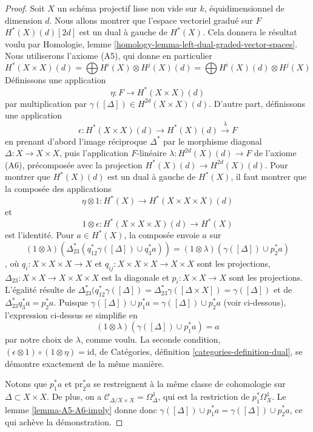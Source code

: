 \begin{proof}
Soit $X$ un schéma projectif lisse non vide sur $k$,
équidimensionnel de dimension $d$. Nous allons montrer que l'espace vectoriel gradué sur $F$
$H^*(X)(d)[2d]$ est un dual à gauche de $H^*(X)$. Cela donnera le résultat voulu par
Homologie, lemme \ref{homology-lemma-left-dual-graded-vector-spaces}.
Nous utiliserons l'axiome (A5), qui donne en particulier
$$
H^*(X \times X)(d) =
\bigoplus H^i(X) \otimes H^j(X)(d) =
\bigoplus H^i(X)(d) \otimes H^j(X)
$$
Définissons une application
$$
\eta : F \longrightarrow H^*(X \times X)(d)
$$
par multiplication par $\gamma([\Delta]) \in H^{2d}(X \times X)(d)$.
D'autre part, définissons une application
$$
\epsilon :
H^*(X \times X)(d) \longrightarrow H^*(X)(d) \xrightarrow{\lambda} F
$$
en prenant d'abord l'image réciproque $\Delta^*$ par le morphisme diagonal
$\Delta : X \to X \times X$, puis l'application $F$-linéaire
$\lambda : H^{2d}(X)(d) \to F$ de l'axiome (A6), précomposée
avec la projection $H^*(X)(d) \to H^{2d}(X)(d)$.
Pour montrer que $H^*(X)(d)$ est un dual à gauche de $H^*(X)$,
il faut montrer que la composée des applications
$$
\eta \otimes 1 :
H^*(X) \longrightarrow H^*(X \times X \times X)(d)
$$
et
$$
1 \otimes \epsilon : H^*(X \times X \times X)(d) \longrightarrow H^*(X)
$$
est l'identité. Pour $a \in H^*(X)$,
la composée envoie $a$ sur
$$
(1 \otimes \lambda)(\Delta_{23}^*(q_{12}^*\gamma([\Delta]) \cup q_3^*a)) =
(1 \otimes \lambda)(\gamma([\Delta]) \cup p_2^*a)
$$,
où $q_i : X \times X \times X \to X$ et
$q_{ij} : X \times X \times X \to X \times X$ sont les projections,
$\Delta_{23} : X \times X \to X \times X \times X$ est la diagonale et
$p_i : X \times X \to X$ sont les projections.
L'égalité résulte de $\Delta_{23}^*(q_{12}^*\gamma([\Delta]) =
\Delta_{23}^*\gamma([\Delta \times X]) = \gamma([\Delta])$
et de $\Delta_{23}^* q_3^*a = p_2^*a$.
Puisque $\gamma([\Delta]) \cup p_1^*a = \gamma([\Delta]) \cup p_2^*a$
(voir ci-dessous), l'expression ci-dessus se simplifie en
$$
(1 \otimes \lambda)(\gamma([\Delta]) \cup p_1^*a) = a
$$
par notre choix de $\lambda$, comme voulu. La seconde condition,
$(\epsilon \otimes 1) \circ (1 \otimes \eta) = \text{id}$,
de Catégories, définition \ref{categories-definition-dual},
se démontre exactement de la
même manière.

\medskip\noindent
Notons que $p_1^*a$ et $\text{pr}_2^*a$ se restreignent à la même
classe de cohomologie sur $\Delta \subset X \times X$. De plus, on
a $\mathcal{C}_{\Delta/X \times X} = \Omega^1_\Delta$, qui
est la restriction de $p_1^*\Omega^1_X$. Le
lemme \ref{lemma-A5-A6-imply} donne donc
$\gamma([\Delta]) \cup p_1^*a = \gamma([\Delta]) \cup p_2^*a$,
ce qui achève la démonstration.
\end{proof}

